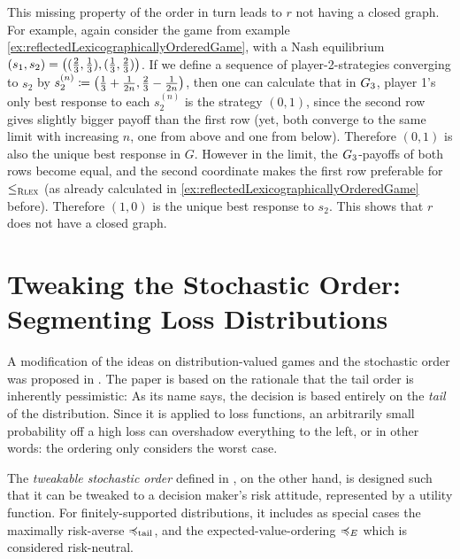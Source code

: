 \documentclass[a4paper]{scrreprt}
\begin{document}
    This missing property of the order in turn leads to $r$ not having a closed graph. For example, again consider the game from example \ref{ex:reflectedLexicographicallyOrderedGame}, with a Nash equilibrium $(s_1, s_2) = \left((\frac{2}{3}, \frac{1}{3}), (\frac{1}{3}, \frac{2}{3})\right)$.
    If we define a sequence of player-2-strategies converging to $s_2$ by $s_2^{(n)} \coloneqq \left(\frac{1}{3} + \frac{1}{2n}, \frac{2}{3} - \frac{1}{2n}\right)$, then one can calculate that in $G_{3}$, player 1's only best response to each $s_2^{(n)}$ is the strategy $(0, 1)$, since the second row gives slightly bigger payoff than the first row (yet, both converge to the same limit with increasing $n$, one from above and one from below). Therefore $(0, 1)$ is also the unique best response in $G$.
    However in the limit, the $G_{3}$-payoffs of both rows become equal, and the second coordinate makes the first row preferable for $\leq_{\textsc{Rlex}}$ (as already calculated in \ref{ex:reflectedLexicographicallyOrderedGame} before). Therefore $(1, 0)$ is the unique best response to $s_2$. This shows that $r$ does not have a closed graph.
    
    \chapter{Tweaking the Stochastic Order: Segmenting Loss Distributions}
    \newcommand{\Fab}{\mathfrak{F}_{[a, b]}} %
    A modification of the ideas on distribution-valued games and the stochastic order was proposed in \cite{bib:tweakableStochasticOrders}.
    The paper is based on the rationale that the tail order is inherently pessimistic: As its name says, the decision is based entirely on the \emph{tail} of the distribution. Since it is applied to loss functions, an arbitrarily small probability off a high loss can overshadow everything to the left, or in other words: the ordering only considers the worst case.
        
    The \emph{tweakable stochastic order} defined in \cite{bib:tweakableStochasticOrders}, on the other hand,
    is designed such that it can be tweaked to a decision maker's risk attitude, represented by a utility function.
    For finitely-supported distributions, it includes as special cases the maximally risk-averse $\preccurlyeq_{\text{tail}}$, and the expected-value-ordering $\preccurlyeq_E$ which is considered risk-neutral.
    
\end{document}
